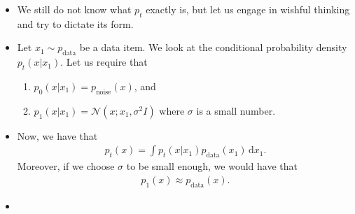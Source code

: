 \documentclass[10pt]{article}
\newcommand{\dee}{\mathrm{d}}
\newcommand{\mrm}[1]{\mathrm{#1}}
\newcommand{\mcal}[1]{\mathcal{#1}}
\begin{document}
\begin{itemize}
  \item We still do not know what $p_t$ exactly is, but let us engage in wishful thinking and try to dictate its form.
  
  \item Let $x_1 \sim p_{\mrm{data}}$ be a data item. We look at the conditional probability density $p_t(x|x_1)$. Let us require that
  \begin{enumerate}
    \item $p_0(x|x_1) = p_{\mrm{noise}}(x)$, and
    \item $p_1(x|x_1) = \mcal{N}(x; x_1, \sigma^2I)$ where $\sigma$ is a small number.
  \end{enumerate}

  \item Now, we have that
  \begin{align*}
    p_t(x) = \int p_t(x|x_1) p_{\mrm{data}}(x_1)\, \dee x_1.
  \end{align*}
  Moreover, if we choose $\sigma$ to be small enough, we would have that
  \begin{align*}
    p_1(x) \approx p_{\mrm{data}}(x).
  \end{align*}

  \item 


\end{itemize}


  
\end{document}
